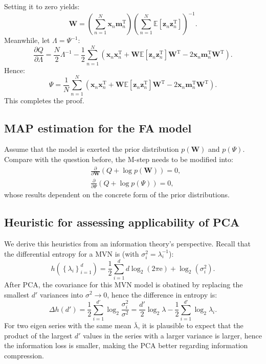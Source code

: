 \documentclass[UTF8]{ctexart}
\begin{document}
Setting it to zero yields:
$$\textbf{W}=\left(\sum_{n=1}^{N}\textbf{x}_{n}\textbf{m}_{n}^{\text{T}}\right)\left(\sum_{n=1}^{N}\mathbb{E}[\textbf{z}_{n}\textbf{z}_{n}^{\text{T}}] \right)^{-1}.$$
Meanwhile, let $\Lambda=\Psi^{-1}$:
$$
\frac{\partial Q}{\partial \Lambda}=\frac{N}{2}\Lambda^{-1}-\frac{1}{2}\sum_{n=1}^{N}\left(\textbf{x}_{n}\textbf{x}_{n}^{\text{T}}+\textbf{W}\mathbb{E}[\textbf{z}_{n}\textbf{z}_{n}^{\text{T}}]\textbf{W}^{\text{T}}-2\textbf{x}_{n}\textbf{m}_{n}^{\text{T}}\textbf{W}^{\text{T}}\right).
$$
Hence:
$$\Psi=\frac{1}{N}\sum_{n=1}^{N}\left(\textbf{x}_{n}\textbf{x}_{n}^{\text{T}}+\textbf{W}\mathbb{E}[\textbf{z}_{n}\textbf{z}_{n}^{\text{T}}]\textbf{W}^{\text{T}}-2\textbf{x}_{n}\textbf{m}_{n}^{\text{T}}\textbf{W}^{\text{T}}\right).$$
This completes the proof.


\subsection{MAP estimation for the FA model}
Assume that the model is exerted the prior distribution $p(\textbf{W})$ and $p(\Psi)$.
Compare with the question before, the M-step needs to be modified into:
$$
\begin{aligned}
&\frac{\partial}{\partial \textbf{W}}(Q+\log p(\textbf{W}))=0,\\
&\frac{\partial}{\partial \Psi}(Q+\log p(\Psi))=0,
\end{aligned}
$$
whose results dependent on the concrete form of the prior distributions.

\subsection{Heuristic for assessing applicability of PCA}
We derive this heuristics from an information theory's perspective.
Recall that the differential entropy for a MVN is (with $\sigma_{i}^{2}=\lambda_{i}^{-1}$):
$$h(\left\{\lambda_{i} \right\}_{i=1}^{d})=\frac{1}{2}\sum_{i=1}^{d}d\log_{2}(2\pi\text{e})+\log_{2}(\sigma_{i}^{2}).$$
After PCA, the covariance for this MVN model is obatined by replacing the smallest $d'$ variances into $\sigma^{2}\rightarrow 0$, hence the difference in entropy is:
$$\Delta h(d')=\frac{1}{2}\sum_{i=1}^{d'}\log_{2}\frac{\sigma^{2}_{i}}{\sigma^{2}}=\frac{d'}{2}\log_{2}\lambda-\frac{1}{2}\sum_{i=1}^{d'}\log_{2}\lambda_{i}.$$
For two eigen series with the same mean $\bar{\lambda}$, it is plausible to expect that the product of the largest $d'$ values in the series with a larger variance is larger, hence the information loss is smaller, making the PCA better regarding information compression.
\end{document}
